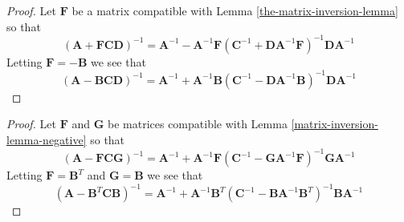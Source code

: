 \begin{proof}
Let $\mathbf{F}$ be a matrix compatible with Lemma \ref{the-matrix-inversion-lemma} so that
\begin{equation*}
    \left( \mathbf{A} + \mathbf{F} \mathbf{C} \mathbf{D} \right)^{-1}
    = \mathbf{A}^{-1} - \mathbf{A}^{-1} \mathbf{F} \left( \mathbf{C}^{-1} + \mathbf{D} \mathbf{A}^{-1} \mathbf{F} \right)^{-1} \mathbf{D} \mathbf{A}^{-1}
\end{equation*}
Letting $\mathbf{F} = - \mathbf{B}$ we see that
\begin{equation*}
    \left( \mathbf{A} - \mathbf{B} \mathbf{C} \mathbf{D} \right)^{-1}
    = \mathbf{A}^{-1} + \mathbf{A}^{-1} \mathbf{B} \left( \mathbf{C}^{-1} - \mathbf{D} \mathbf{A}^{-1} \mathbf{B} \right)^{-1} \mathbf{D} \mathbf{A}^{-1}
\end{equation*}
\end{proof}


\begin{proof}
Let $\mathbf{F}$ and $\mathbf{G}$ be matrices compatible with Lemma \ref{matrix-inversion-lemma-negative} so that
\begin{equation*}
    \left( \mathbf{A} - \mathbf{F} \mathbf{C} \mathbf{G} \right)^{-1}
    = \mathbf{A}^{-1} + \mathbf{A}^{-1} \mathbf{F} \left( \mathbf{C}^{-1} - \mathbf{G} \mathbf{A}^{-1} \mathbf{F} \right)^{-1} \mathbf{G} \mathbf{A}^{-1}
\end{equation*}
Letting $\mathbf{F} = \mathbf{B}^T$ and $\mathbf{G} = \mathbf{B}$ we see that
\begin{equation*}
    \left( \mathbf{A} - \mathbf{B}^T \mathbf{C} \mathbf{B} \right)^{-1}
    = \mathbf{A}^{-1} + \mathbf{A}^{-1} \mathbf{B}^T \left( \mathbf{C}^{-1} - \mathbf{B} \mathbf{A}^{-1} \mathbf{B}^T \right)^{-1} \mathbf{B} \mathbf{A}^{-1}
\end{equation*}
\end{proof}

